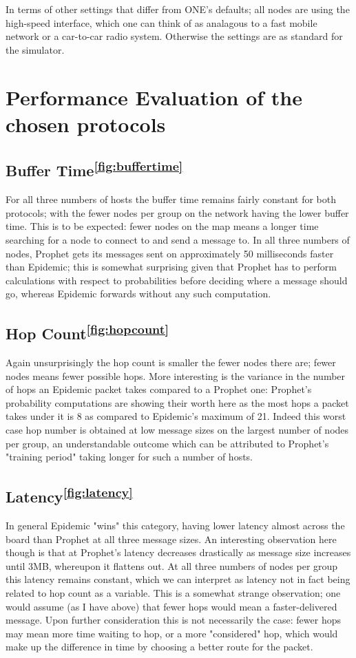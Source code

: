 \documentclass[12pt]{report}
\begin{document}
In terms of other settings that differ from ONE's defaults; all nodes are using the high-speed interface, which one can think of as analagous to a fast mobile network or a car-to-car radio system.
Otherwise the settings are as standard for the simulator.

\section{Performance Evaluation of the chosen protocols}
\subsection{Buffer Time\textsuperscript{\ref{fig:buffertime}}}
For all three numbers of hosts the buffer time remains fairly constant for both protocols; with the fewer nodes per group on the network having the lower buffer time.
This is to be expected: fewer nodes on the map means a longer time searching for a node to connect to and send a message to.
In all three numbers of nodes, Prophet gets its messages sent on approximately 50 milliseconds faster than Epidemic; this is somewhat surprising given that Prophet has to perform calculations with respect to probabilities before deciding where a message should go, whereas Epidemic forwards without any such computation.

\subsection{Hop Count\textsuperscript{\ref{fig:hopcount}}}
Again unsurprisingly the hop count is smaller the fewer nodes there are; fewer nodes means fewer possible hops.
More interesting is the variance in the number of hops an Epidemic packet takes compared to a Prophet one: Prophet's probability computations are showing their worth here as the most hops a packet takes under it is 8 as compared to Epidemic's maximum of 21.
Indeed this worst case hop number is obtained at low message sizes on the largest number of nodes per group, an understandable outcome which can be attributed to Prophet's "training period" taking longer for such a number of hosts.

\subsection{Latency\textsuperscript{\ref{fig:latency}}}
In general Epidemic "wins" this category, having lower latency almost across the board than Prophet at all three message sizes.
An interesting observation here though is that at Prophet's latency decreases drastically as message size increases until 3MB, whereupon it flattens out.
At all three numbers of nodes per group this latency remains constant, which we can interpret as latency not in fact being related to hop count as a variable.
This is a somewhat strange observation; one would assume (as I have above) that fewer hops would mean a faster-delivered message.
Upon further consideration this is not necessarily the case: fewer hops may mean more time waiting to hop, or a more "considered" hop, which would make up the difference in time by choosing a better route for the packet.
\end{document}
